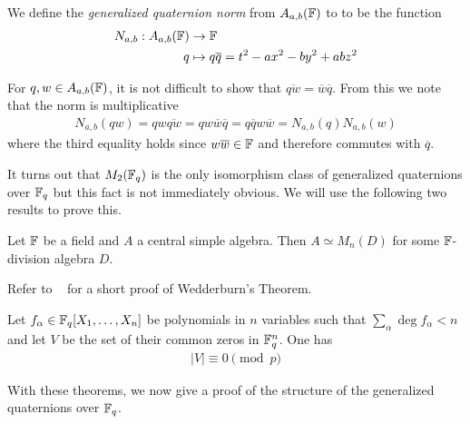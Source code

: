 \documentclass{amsart}
\begin{document}
\begin{defn}
    We define the \textit{generalized quaternion norm} from $A_{a,b}(\protect\mathbb{F})$ to \bF to be the function 
    \begin{align*}
        N_{a,b}:  A_{a,b}(\protect\mathbb{F}) & \rightarrow \protect\mathbb{F}  \\
        q & \mapsto q \overline{q} = t^2 -ax^2 -by^2 +abz^2 
    \end{align*}
\end{defn}
For $q, w \in A_{a,b}(\protect\mathbb{F})$, it is not difficult to show that $\overline{qw} = \overline{w} \overline{q}$. From this we note that the norm is multiplicative
\begin{align*}
    N_{a,b}(qw) = qw\overline{qw} = qw\overline{w}\overline{q}= q\overline{q}w\overline{w} = N_{a,b}(q)N_{a,b}(w)
\end{align*}
where the third equality holds since $w\overline{w} \in \protect\mathbb{F}$ and therefore commutes with $\overline{q}$.

It turns out that $M_2(\protect\mathbb{F}_q)$ is the only isomorphism class of generalized quaternions over $\protect\mathbb{F}_q$ but this fact is not immediately obvious. We will use the following two results to prove this.

\begin{theorem}\label{wedderburn}
    Let $\protect\mathbb{F}$ be a field and $A$ a central simple algebra. Then $A \simeq M_n(D)$ for some $\protect\mathbb{F}$-division algebra $D$.
\end{theorem}

Refer to ~\cite{Henderson65} for a short proof of Wedderburn's Theorem.

\begin{theorem}\label{c-warning}
    Let $f_{\alpha} \in \protect\mathbb{F}_q[X_1, \dots, X_n]$ be polynomials in $n$ variables such that $\sum_{\alpha} \deg f_{\alpha} < n$ and let $V$ be the set of their common zeros in $\protect\mathbb{F}_q^n$. One has 
    \begin{align*}
        | V | \equiv 0 \pmod{p}
    \end{align*}
\end{theorem}

With these theorems, we now give a proof of the structure of the generalized quaternions over $\protect\mathbb{F}_q$.
\end{document}
